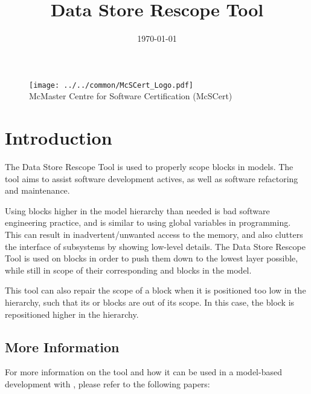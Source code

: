 \documentclass{article}
\makeatletter
\newcommand{\ToolName}{Data Store Rescope Tool\@\xspace}
\makeatother
\begin{document}
\title{\ToolName}
\date{\monthyeardate\today}
\maketitle
\vfill

\begin{figure}
	\centering
	\texttt{[image: ../../common/McSCert\_Logo.pdf]} \\
	McMaster Centre for Software Certification (McSCert)
\end{figure}

\newpage

\section{Introduction}

The \ToolName is used to properly scope \DSM blocks in \Simulink models. The tool aims to assist software development actives, as well as software refactoring and maintenance.

Using \DSM blocks higher in the model hierarchy than needed is bad software engineering practice, and is similar to using global variables in programming. This can result in inadvertent/unwanted access to the memory, and also clutters the interface of subsystems by showing low-level details. The \ToolName is used on \DSM blocks in order to push them down to the lowest layer possible, while still in scope of their corresponding \DSR and \DSW blocks in the model.

This tool can also repair the scope of a \DSM block when it is positioned too low in the hierarchy, such that its \DSR or \DSW blocks are out of its scope. In this case, the \DSM block is repositioned higher in the hierarchy.

\subsection*{More Information}
For more information on the tool and how it can be used in a model-based development with \Simulink, please refer to the following papers:
\end{document}
